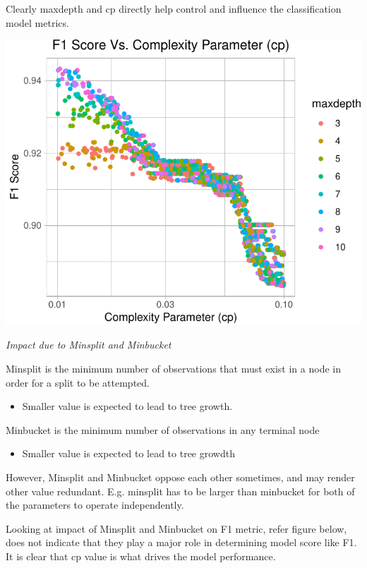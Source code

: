 \documentclass[
]{article}
\providecommand{\tightlist}{%
  \setlength{\itemsep}{0pt}\setlength{\parskip}{0pt}}
\begin{document}
Clearly maxdepth and cp directly help control and influence the
classification model metrics.

\begin{center}\includegraphics{case_study03_files/figure-latex/unnamed-chunk-23-1} \end{center}

\emph{Impact due to Minsplit and Minbucket}

Minsplit is the minimum number of observations that must exist in a node
in order for a split to be attempted.

\begin{itemize}
\tightlist
\item
  Smaller value is expected to lead to tree growth.
\end{itemize}

Minbucket is the minimum number of observations in any terminal node

\begin{itemize}
\tightlist
\item
  Smaller value is expected to lead to tree growdth
\end{itemize}

However, Minsplit and Minbucket oppose each other sometimes, and may
render other value redundant. E.g. minsplit has to be larger than
minbucket for both of the parameters to operate independently.

Looking at impact of Minsplit and Minbucket on F1 metric, refer figure
below, does not indicate that they play a major role in determining
model score like F1. It is clear that cp value is what drives the model
performance.
\end{document}
